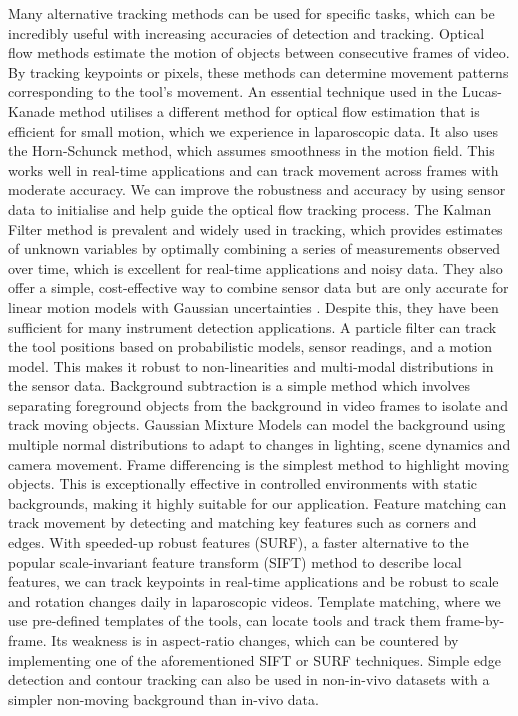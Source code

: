 Many alternative tracking methods can be used for specific tasks, which can be incredibly useful with increasing accuracies of detection and tracking. Optical flow methods estimate the motion of objects between consecutive frames of video. By tracking keypoints or pixels, these methods can determine movement patterns corresponding to the tool's movement. An essential technique used in the Lucas-Kanade method utilises a different method for optical flow estimation that is efficient for small motion, which we experience in laparoscopic data. It also uses the Horn-Schunck method, which assumes smoothness in the motion field. This works well in real-time applications and can track movement across frames with moderate accuracy. We can improve the robustness and accuracy by using sensor data to initialise and help guide the optical flow tracking process. The Kalman Filter method is prevalent and widely used in tracking, which provides estimates of unknown variables by optimally combining a series of measurements observed over time, which is excellent for real-time applications and noisy data. They also offer a simple, cost-effective way to combine sensor data but are only accurate for linear motion models with Gaussian uncertainties \cite{bouget_vision-based_2017}. Despite this, they have been sufficient for many instrument detection applications. A particle filter can track the tool positions based on probabilistic models, sensor readings, and a motion model. This makes it robust to non-linearities and multi-modal distributions in the sensor data. Background subtraction is a simple method which involves separating foreground objects from the background in video frames to isolate and track moving objects. Gaussian Mixture Models can model the background using multiple normal distributions to adapt to changes in lighting, scene dynamics and camera movement. Frame differencing is the simplest method to highlight moving objects. This is exceptionally effective in controlled environments with static backgrounds, making it highly suitable for our application. Feature matching can track movement by detecting and matching key features such as corners and edges. With speeded-up robust features (SURF), a faster alternative to the popular scale-invariant feature transform (SIFT) method to describe local features, we can track keypoints in real-time applications and be robust to scale and rotation changes daily in laparoscopic videos. Template matching, where we use pre-defined templates of the tools, can locate tools and track them frame-by-frame. Its weakness is in aspect-ratio changes, which can be countered by implementing one of the aforementioned SIFT or SURF techniques. Simple edge detection and contour tracking can also be used in non-in-vivo datasets with a simpler non-moving background than in-vivo data.


